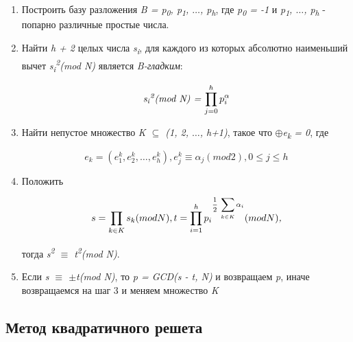     \begin{enumerate}
     \item Построить базу разложения \textit{B = {p\textsubscript{0}, p\textsubscript{1}, {$\dots$}, p\textsubscript{h}}}, 
     где \textit{p\textsubscript{0} = -1} и \textit{p\textsubscript{1}, {$\dots$}, p\textsubscript{h}} - попарно различные простые числа.
     \item Найти \textit{h + 2} целых числа \textit{s\textsubscript{i}}, для каждого из которых абсолютно наименьший вычет
     \textit{s\textsubscript{i}\textsuperscript{2}(mod N)} является \textit{B-гладким}:
     
	\begin{equation}
	  \textit{s\textsubscript{i}\textsuperscript{2}(mod N) = {$\prod_{j=0}^{h}{p_i^\alpha}$}}
	\end{equation}
     
     \item Найти непустое множество \textit{K {$\subseteq$} (1, 2, {$\dots$}, h+1)}, такое что \textit{{$\oplus$}e\textsubscript{k} = 0}, где 
     
	\begin{equation}
	  \textit{{$e_k = (e_1^k, e_2^k, \dots, e_h^k), e_j^k \equiv \alpha_j(mod 2), 0 \le j \le h$}}
	\end{equation}
     
     \item Положить 
     
	\begin{equation}
	  \textit{{$ s = \prod_{k \in K}{s_k(mod N)}, t = \prod_{i=1}^{h}{p_i\textsuperscript{{$\frac{1}{2}$} {$\sum_{k \in K}{\alpha_i}$}}(mod N)}$},}
	\end{equation}
     
     тогда \textit{s\textsuperscript{2} {$\equiv$} t\textsuperscript{2}(mod N)}.
     \item Если \textit{s {$\equiv$} {$\pm$}t(mod N)}, то \textit{p = GCD(s - t, N)} и возвращаем \textit{p}, иначе возвращаемся на шаг 3 и меняем множество \textit{K}
    \end{enumerate}
  

\subsection{Метод квадратичного решета}

